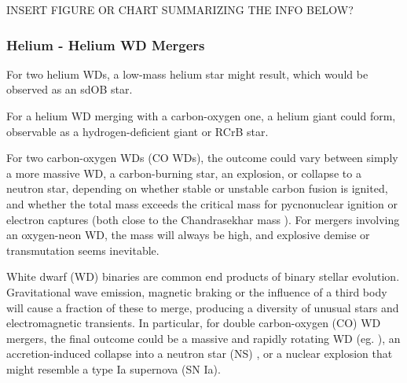 {\charles INSERT FIGURE OR CHART SUMMARIZING THE INFO BELOW?}

\subsubsection{Helium - Helium WD Mergers}



For two helium WDs, a low-mass helium star might result, which would be observed as an sdOB star.  

For a helium WD merging with a carbon-oxygen one, a helium giant could form, observable as a hydrogen-deficient giant or RCrB star.  

For two carbon-oxygen WDs (CO WDs), the outcome could vary between simply a more massive WD, a carbon-burning star, an explosion, or collapse to a neutron star, depending on whether stable or unstable carbon fusion is ignited, and whether the total mass exceeds the critical mass for pycnonuclear ignition or electron captures (both close to the Chandrasekhar mass \Mch).  For mergers involving an oxygen-neon WD, the mass will always be high, and explosive demise or transmutation seems inevitable.

White dwarf (WD) binaries are common end products of binary stellar evolution.  Gravitational wave emission, magnetic braking or the influence of a third body will cause a fraction of these to merge, producing a diversity of unusual stars and electromagnetic transients.  In particular, for double carbon-oxygen (CO) WD mergers, the final outcome could be a massive and rapidly rotating WD (eg. \citealt{segrcm97}), an accretion-induced collapse into a neutron star (NS) \citep{saion85}, or a nuclear explosion that might resemble a type Ia supernova (SN Ia).

